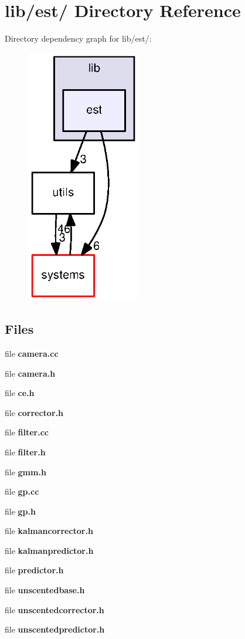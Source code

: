 \section{lib/est/ \-Directory \-Reference}
\label{dir_3b636a2fe10cf13223a289e1608e9936}
\-Directory dependency graph for lib/est/\-:
\nopagebreak
\begin{figure}[H]
\begin{center}
\leavevmode
\includegraphics[width=141pt]{dir_3b636a2fe10cf13223a289e1608e9936_dep}
\end{center}
\end{figure}
\subsection*{\-Files}
\begin{DoxyCompactItemize}
\item 
file {\bf camera.\-cc}
\item 
file {\bf camera.\-h}
\item 
file {\bf ce.\-h}
\item 
file {\bf corrector.\-h}
\item 
file {\bf filter.\-cc}
\item 
file {\bf filter.\-h}
\item 
file {\bf gmm.\-h}
\item 
file {\bf gp.\-cc}
\item 
file {\bf gp.\-h}
\item 
file {\bf kalmancorrector.\-h}
\item 
file {\bf kalmanpredictor.\-h}
\item 
file {\bf predictor.\-h}
\item 
file {\bf unscentedbase.\-h}
\item 
file {\bf unscentedcorrector.\-h}
\item 
file {\bf unscentedpredictor.\-h}
\end{DoxyCompactItemize}
